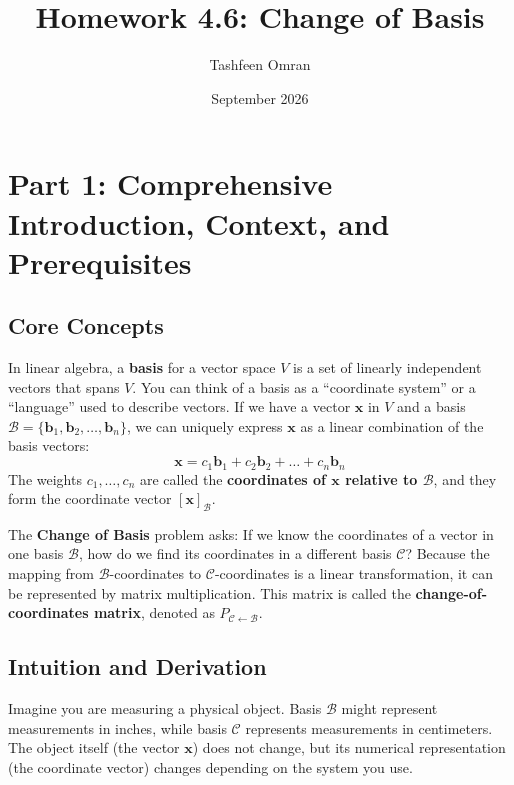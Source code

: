 \documentclass[11pt]{article}
\title{\textbf{Homework 4.6: Change of Basis}}
\author{Tashfeen Omran}
\date{September 2026}
\begin{document}
\maketitle
\tableofcontents
\newpage

\section{Part 1: Comprehensive Introduction, Context, and Prerequisites}

\subsection{Core Concepts}
In linear algebra, a \textbf{basis} for a vector space $V$ is a set of linearly independent vectors that spans $V$. You can think of a basis as a ``coordinate system'' or a ``language'' used to describe vectors. If we have a vector $\mathbf{x}$ in $V$ and a basis $\mathcal{B} = \{\mathbf{b}_1, \mathbf{b}_2, \dots, \mathbf{b}_n\}$, we can uniquely express $\mathbf{x}$ as a linear combination of the basis vectors:
\[ \mathbf{x} = c_1\mathbf{b}_1 + c_2\mathbf{b}_2 + \dots + c_n\mathbf{b}_n \]
The weights $c_1, \dots, c_n$ are called the \textbf{coordinates of $\mathbf{x}$ relative to $\mathcal{B}$}, and they form the coordinate vector $[\mathbf{x}]_{\mathcal{B}}$.

The \textbf{Change of Basis} problem asks: If we know the coordinates of a vector in one basis $\mathcal{B}$, how do we find its coordinates in a different basis $\mathcal{C}$? Because the mapping from $\mathcal{B}$-coordinates to $\mathcal{C}$-coordinates is a linear transformation, it can be represented by matrix multiplication. This matrix is called the \textbf{change-of-coordinates matrix}, denoted as $P_{\mathcal{C} \leftarrow \mathcal{B}}$.

\subsection{Intuition and Derivation}
Imagine you are measuring a physical object. Basis $\mathcal{B}$ might represent measurements in inches, while basis $\mathcal{C}$ represents measurements in centimeters. The object itself (the vector $\mathbf{x}$) does not change, but its numerical representation (the coordinate vector) changes depending on the system you use. 
\end{document}
